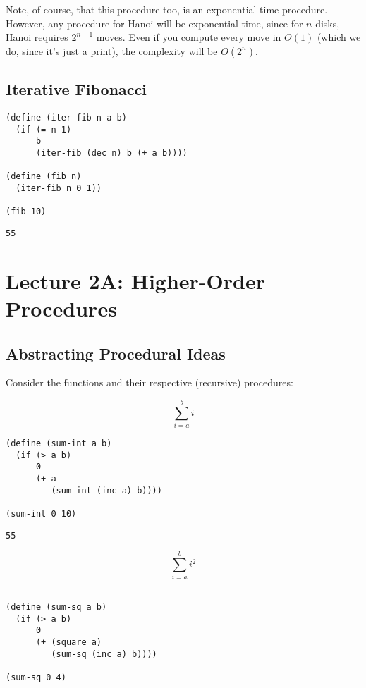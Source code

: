 \documentclass[9pt]{report}
\begin{document}
Note, of course, that this procedure too, is an exponential time
procedure. However, any procedure for Hanoi will be exponential
time, since for \(n\) disks, Hanoi requires \(2^{n-1}\) moves. Even if
you compute every move in \(O(1)\) (which we do, since it's just a
print), the complexity will be \(O(2^n)\).

\section{Iterative Fibonacci}
\label{sec:orgabc5f16}

\begin{verbatim}
(define (iter-fib n a b)
  (if (= n 1)
      b
      (iter-fib (dec n) b (+ a b))))

(define (fib n)
  (iter-fib n 0 1))

(fib 10)
\end{verbatim}

\begin{verbatim}
55
\end{verbatim}

\chapter{Lecture 2A: Higher-Order Procedures}
\label{sec:org74932c9}

\section{Abstracting Procedural Ideas}
\label{sec:orgcb2faf9}

Consider the functions and their respective (recursive) procedures:

$$\sum_{i=a}^{b} i$$

\begin{verbatim}
(define (sum-int a b)
  (if (> a b)
      0
      (+ a
         (sum-int (inc a) b))))

(sum-int 0 10)
\end{verbatim}

\begin{verbatim}
55
\end{verbatim}


$$\sum_{i=a}^{b} i^{2}$$

\begin{verbatim}

(define (sum-sq a b)
  (if (> a b)
      0
      (+ (square a)
         (sum-sq (inc a) b))))

(sum-sq 0 4)
\end{verbatim}
\end{document}
